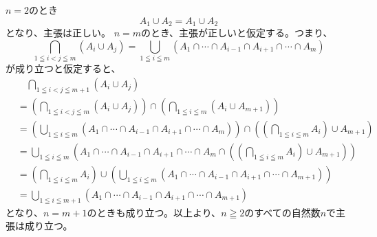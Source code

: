\documentclass{jsarticle}
\begin{document}
\subsection{}
$n=2$のとき
\[A_1 \cup A_2 =A_1\cup A_2\]
となり、主張は正しい。
$n=m$のとき、主張が正しいと仮定する。つまり、
\[\bigcap_{1\leqq i<j\leqq m}(A_i \cup A_j )=\bigcup_{1\leqq i\leqq m}(A_1\cap \cdots\cap A_{i-1}
\cap A_{i+1} \cap \cdots \cap A_{m})\]
が成り立つと仮定すると、
\begin{align*}
&\quad\bigcap_{1\leqq i<j\leqq m+1}(A_i \cup A_j )\\
&=(\bigcap_{1\leqq i<j\leqq m}(A_i \cup A_j ))\cap (\bigcap_{1\leqq i\leqq m}(A_{i}\cup A_{m+1}))\\
&=(\bigcup_{1\leqq i\leqq m}(A_1\cap \cdots\cap A_{i-1}\cap A_{i+1} \cap \cdots \cap A_{m}))\cap((\bigcap_{1\leqq i\leqq m}A_{i})\cup A_{m+1})\\
&=\bigcup_{1\leqq i\leqq m}(A_1\cap \cdots\cap A_{i-1}\cap A_{i+1} \cap \cdots \cap A_{m}\cap((\bigcap_{1\leqq i\leqq m}A_{i})\cup A_{m+1}))\\
&=(\bigcap_{1\leqq i\leqq m}A_{i})\cup(\bigcup_{1\leqq i\leqq m}(A_1\cap \cdots\cap A_{i-1}\cap A_{i+1} \cap \cdots \cap A_{m+1}))\\
&=\bigcup_{1\leqq i\leqq m+1}(A_1\cap \cdots\cap A_{i-1}
\cap A_{i+1} \cap \cdots \cap A_{m+1})
\end{align*}
となり、$n=m+1$のときも成り立つ。以上より、$n\geqq 2$のすべての自然数$n$で主張は成り立つ。
\end{document}
